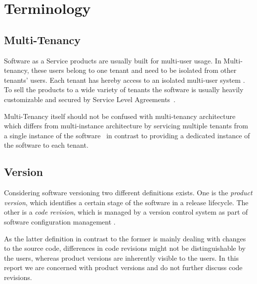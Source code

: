 \section{Terminology}
\label{sec:terminology}

\subsection{Multi-Tenancy}

Software as a Service products are usually built for multi-user usage. In Multi-tenancy, these users belong to one tenant and need to be isolated from other tenants' users. Each tenant has hereby access to an isolated multi-user system \cite{Chong2006a}. To sell the products to a wide variety of tenants the software is usually heavily customizable and secured by Service Level Agreements~\cite{Bezemer2010}.

Multi-Tenancy itself should not be confused with multi-tenancy architecture which differs from multi-instance architecture by servicing multiple tenants from a single instance of the software~\cite{Shao2011} in contrast to providing a dedicated instance of the software to each tenant.

\subsection{Version}

Considering software versioning two different definitions exists. One is the \emph{product version}, which identifies a certain stage of the software in a release lifecycle. The other is a \emph{code revision}, which is managed by a version control system as part of software configuration management \cite{swebook}.

As the latter definition in contrast to the former is mainly dealing with changes to the source code, differences in code revisions might not be distinguishable by the users, whereas product versions are inherently visible to the users. In this report we are concerned with product versions and do not further discuss code revisions.

